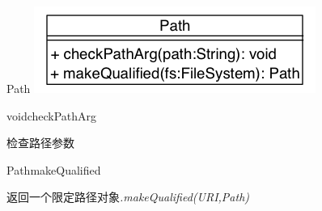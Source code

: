 \begin{XeClass}{Path}
\includegraphics[width=\textwidth]{cdig/Path.png}
    
    \begin{XeMethod}{\XePrivate}{void}{checkPathArg}
         
 检查路径参数

    \end{XeMethod}

    \begin{XeMethod}{\XePublic}{Path}{makeQualified}
         
 返回一个限定路径对象\emph{.makeQualified(URI,Path)}

    \end{XeMethod}

\end{XeClass}
